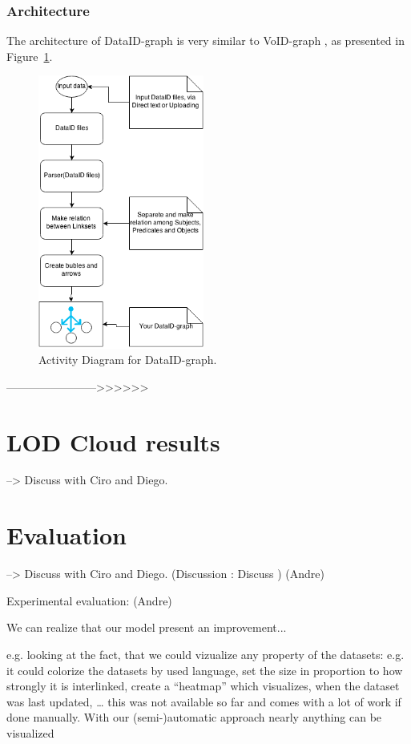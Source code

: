 \documentclass{iosart2c}
\begin{document}
\subsubsection{Architecture}
The architecture of DataID-graph is very similar to VoID-graph  \cite{Voidgraph}, as presented in Figure~\ref{fig:dataidgraph}.

\begin{figure}[t]
 \centering
\includegraphics[height=9cm]{img/DataID-Graph.png}
  \caption{Activity Diagram for DataID-graph.}
  \label{fig:dataidgraph}
\end{figure}
------------------------>>>>>>

\section{LOD Cloud results}
--> Discuss with Ciro and Diego.

\section{Evaluation}
--> Discuss with Ciro and Diego.
(Discussion : Discuss ) (Andre)

Experimental evaluation: (Andre)

We can realize that our model present an improvement...

e.g. looking at the fact, that we could vizualize any property of the datasets: e.g. it could colorize the datasets by used language, set the size in proportion to how strongly it is interlinked, create a “heatmap” which visualizes, when the dataset was last updated, … this was not available so far and comes with a lot of work if done manually. With our (semi-)automatic approach nearly anything can be visualized
\end{document}

